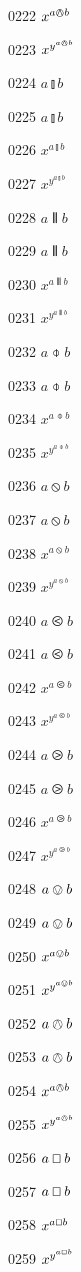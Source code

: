 \documentclass{article}
\begin{document}
0222 $x^{a\varowedge b}$\par
0223 $x^{y^{a\varowedge b}}$\par
0224 $a\talloblong b$\par
0225 $\displaystyle a\talloblong b$\par
0226 $x^{a\talloblong b}$\par
0227 $x^{y^{a\talloblong b}}$\par
0228 $a\interleave b$\par
0229 $\displaystyle a\interleave b$\par
0230 $x^{a\interleave b}$\par
0231 $x^{y^{a\interleave b}}$\par
0232 $a\obar b$\par
0233 $\displaystyle a\obar b$\par
0234 $x^{a\obar b}$\par
0235 $x^{y^{a\obar b}}$\par
0236 $a\obslash b$\par
0237 $\displaystyle a\obslash b$\par
0238 $x^{a\obslash b}$\par
0239 $x^{y^{a\obslash b}}$\par
0240 $a\olessthan b$\par
0241 $\displaystyle a\olessthan b$\par
0242 $x^{a\olessthan b}$\par
0243 $x^{y^{a\olessthan b}}$\par
0244 $a\ogreaterthan b$\par
0245 $\displaystyle a\ogreaterthan b$\par
0246 $x^{a\ogreaterthan b}$\par
0247 $x^{y^{a\ogreaterthan b}}$\par
0248 $a\ovee b$\par
0249 $\displaystyle a\ovee b$\par
0250 $x^{a\ovee b}$\par
0251 $x^{y^{a\ovee b}}$\par
0252 $a\owedge b$\par
0253 $\displaystyle a\owedge b$\par
0254 $x^{a\owedge b}$\par
0255 $x^{y^{a\owedge b}}$\par
0256 $a\oblong b$\par
0257 $\displaystyle a\oblong b$\par
0258 $x^{a\oblong b}$\par
0259 $x^{y^{a\oblong b}}$\par
\end{document}
